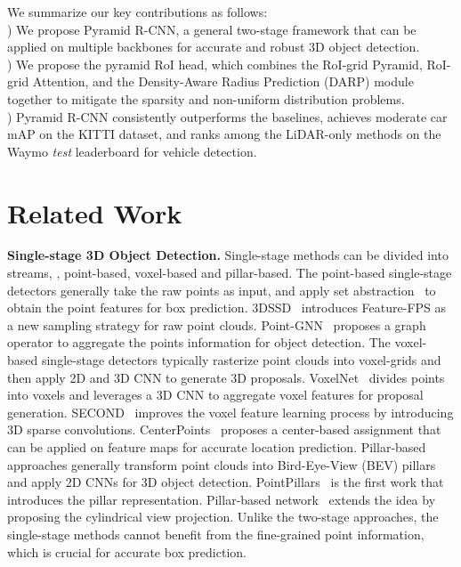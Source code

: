 \documentclass[10pt,twocolumn,letterpaper]{article}
\begin{document}
We summarize our key contributions as follows: \\
) We propose Pyramid R-CNN, a general two-stage framework that can be applied on multiple backbones for accurate and robust 3D object detection.\\
) We propose the pyramid RoI head, which combines the RoI-grid Pyramid, RoI-grid Attention, and the Density-Aware Radius Prediction (DARP) module together to mitigate the sparsity and non-uniform distribution problems.\\ 
) Pyramid R-CNN consistently outperforms the baselines, achieves  moderate car mAP on the KITTI dataset, and ranks  among the LiDAR-only methods on the Waymo \textit{test} leaderboard for vehicle detection.

\section{Related Work}

\noindent\textbf{Single-stage 3D Object Detection.} Single-stage methods can be divided into  streams, \ie, point-based, voxel-based and pillar-based. The point-based single-stage detectors generally take the raw points as input, and apply set abstraction~\cite{qi2017pointnet++, mao2019interpolated} to obtain the point features for box prediction. 3DSSD~\cite{yang20203dssd} introduces Feature-FPS as a new sampling strategy for raw point clouds. Point-GNN~\cite{pointgnn} proposes a graph operator to aggregate the points information for object detection. The voxel-based single-stage detectors typically rasterize point clouds into voxel-grids and then apply 2D and 3D CNN to generate 3D proposals. VoxelNet~\cite{zhou2018voxelnet} divides points into voxels and leverages a 3D CNN to aggregate voxel features for proposal generation. SECOND~\cite{yan2018second} improves the voxel feature learning process by introducing 3D sparse convolutions. CenterPoints~\cite{yin2020center} proposes a center-based assignment that can be applied on feature maps for accurate location prediction. Pillar-based approaches generally transform point clouds into Bird-Eye-View (BEV) pillars and apply 2D CNNs for 3D object detection. PointPillars~\cite{lang2019pointpillars} is the first work that introduces the pillar representation. Pillar-based network~\cite{wang2020pillar} extends the idea by proposing the cylindrical view projection. Unlike the two-stage approaches, the single-stage methods cannot benefit from the fine-grained point information, which is crucial for accurate box prediction.
\end{document}
